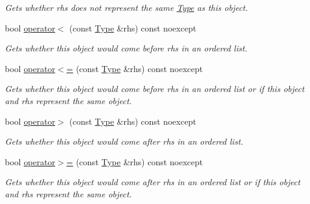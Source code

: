 \begin{DoxyCompactItemize}
\begin{DoxyCompactList}\small\item\em Gets whether {\ttfamily rhs} does not represent the same \hyperlink{classdg_1_1deepcore_1_1_type}{Type} as this object. \end{DoxyCompactList}\item 
bool \hyperlink{classdg_1_1deepcore_1_1_type_a4c1fe67ba21b430c7f59be7769b6f31a}{operator$<$} (const \hyperlink{classdg_1_1deepcore_1_1_type}{Type} \&rhs) const noexcept
\begin{DoxyCompactList}\small\item\em Gets whether this object would come before {\ttfamily rhs} in an ordered list. \end{DoxyCompactList}\item 
bool \hyperlink{classdg_1_1deepcore_1_1_type_aeaa6e92a7b3b06baace0543bb3436a40}{operator$<$=} (const \hyperlink{classdg_1_1deepcore_1_1_type}{Type} \&rhs) const noexcept
\begin{DoxyCompactList}\small\item\em Gets whether this object would come before {\ttfamily rhs} in an ordered list or if this object and {\ttfamily rhs} represent the same object. \end{DoxyCompactList}\item 
bool \hyperlink{classdg_1_1deepcore_1_1_type_ab7f7f06afef3c8aa511b12590b5245e6}{operator$>$} (const \hyperlink{classdg_1_1deepcore_1_1_type}{Type} \&rhs) const noexcept
\begin{DoxyCompactList}\small\item\em Gets whether this object would come after {\ttfamily rhs} in an ordered list. \end{DoxyCompactList}\item 
bool \hyperlink{classdg_1_1deepcore_1_1_type_a32e80f1c0b7fb80ab2729de6d5bcbdac}{operator$>$=} (const \hyperlink{classdg_1_1deepcore_1_1_type}{Type} \&rhs) const noexcept
\begin{DoxyCompactList}\small\item\em Gets whether this object would come after {\ttfamily rhs} in an ordered list or if this object and {\ttfamily rhs} represent the same object. \end{DoxyCompactList}\end{DoxyCompactItemize}
